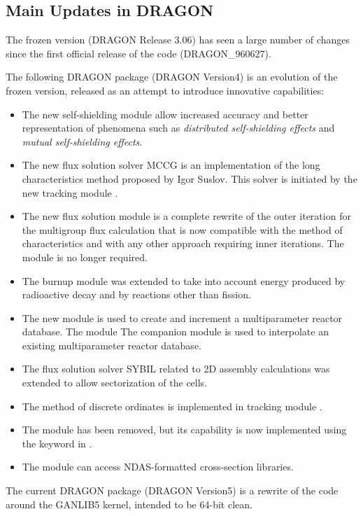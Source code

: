 \subsection{Main Updates in DRAGON}\label{sect:Updates}

The frozen version (DRAGON Release 3.06) has seen a large number of changes since
the first official release of the code (DRAGON\_960627).

\vskip 0.15cm

The following DRAGON package (DRAGON Version4) is an evolution of the frozen version,
released as an attempt to introduce innovative capabilities:

\begin{itemize}

\item The new self-shielding module  allow increased accuracy and better representation
of phenomena such as {\sl distributed self-shielding effects} and {\sl mutual self-shielding effects}.

\item The new flux solution solver MCCG is an implementation of the long characteristics method proposed
by Igor Suslov. This solver is initiated by the new tracking module .

\item The new flux solution module  is a complete rewrite of the outer iteration
for the multigroup flux calculation that is now compatible with the method of characteristics and with
any other approach requiring inner iterations. The  module is no longer required.

\item The burnup module  was extended to take into account energy produced by radioactive
decay and by reactions other than fission.

\item The new module  is used to create and increment a multiparameter reactor database. The
module The companion module  is used to interpolate an existing multiparameter reactor database.

\item The flux solution solver SYBIL related to 2D assembly calculations was extended to allow
sectorization of the cells.

\item The method of discrete ordinates is implemented in tracking module .

\item The  module has been removed, but its capability is now implemented using the  keyword
in .

\item The  module can access NDAS-formatted cross-section libraries.

\end{itemize}

\vskip 0.15cm

The current DRAGON package (DRAGON Version5) is a rewrite of the code around the GANLIB5 kernel\cite{ganlib5}, intended to be 64-bit clean.
